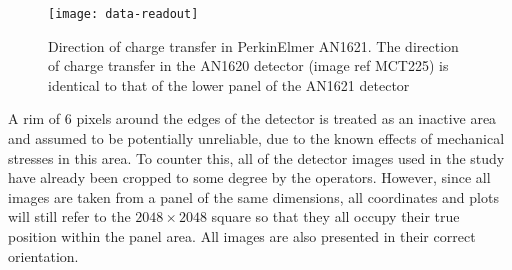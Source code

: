 \documentclass[\main/IO-Pixels.tex]{subfiles}
\begin{document}
\begin{figure}[!ht]
\caption{ Direction of charge transfer in PerkinElmer AN1621. The direction of charge transfer in the AN1620 detector (image ref MCT225) is identical to that of the lower panel of the AN1621 detector }
\label{fig:charge-transfer-direction}
\texttt{[image: data-readout]}
\end{figure} 


A rim of 6 pixels around the edges of the detector is treated as an inactive area and assumed to be potentially unreliable, due to the known effects of mechanical stresses in this area. To counter this, all of the detector images used in the study have already been cropped to some degree by the operators.  However, since all images are taken from a panel of the same dimensions, all coordinates and plots will still refer to the $2048 \times 2048$ square so that they all occupy their true position within the panel area. All images are also presented in their correct orientation.
  
\end{document}
